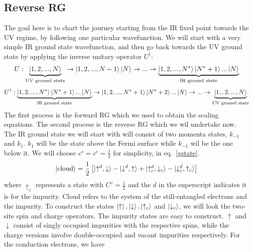 \documentclass[12pt,twoside]{article}
\numberwithin{equation}{section}
\begin{document}
\subsection{Reverse RG}
The goal here is to chart the journey starting from the IR fixed point towards the UV regime, by following one particular wavefunction. We will start with a very simple IR ground state wavefunction, and then go back towards the UV ground state by applying the inverse unitary operator \(U^\dagger\):
\begin{equation*}\begin{aligned}
	U : \underbrace{\ket{1,2,...,N}}_\text{UV ground state} \rightarrow \ket{1,2,...,N-1}\ket{N} \rightarrow ... \rightarrow \underbrace{\ket{1,2,...,N^*}\ket{N^*+1}...\ket{N}}_\text{IR ground state}
\end{aligned}\end{equation*}
\begin{equation*}\begin{aligned}
	U^\dagger : \underbrace{\ket{1,2,...,N^*}\ket{N^*+1}...\ket{N}}_\text{IR ground state} \rightarrow \ket{1,2,...,N^*+1}\ket{N^*+2}...\ket{N} \rightarrow ... \rightarrow\underbrace{\ket{1,,2,...,N}}_\text{UV ground state}
\end{aligned}\end{equation*}
The first process is the forward RG which we used to obtain the scaling equations. The second process is the reverse RG which we wil undertake now. The IR ground state we will start with will consist of two momenta states, \(k_{-1}\) and \(k_1\). \(k_1\) will be the state above the Fermi surface while \(k_{-1}\) wil be the one below it. We will choose \(c^s = c^c = \frac{1}{2}\) for simplicity, in eq.~\ref{gstate}.
\begin{equation}\begin{aligned}
	\ket{\text{cloud}} = \frac{1}{2}\left[ \ket{\uparrow^d, \downarrow} - \ket{\downarrow^d, \uparrow} + \ket{ \uparrow^d_c, \downarrow_c} - \ket{\downarrow^d_c, \uparrow_c} \right] 
\end{aligned}\end{equation}
where \(\uparrow_c\) represents a state with \(C^z= \frac{1}{2}\) and the \(d\) in the superscript indicates it is for the impurity. Cloud refers to the system of the still-entangled electrons and the impurity. To construct the states \(\ket{\uparrow}, \ket{\downarrow}, \ket{\uparrow_c}\) and \(\ket{\downarrow_c}\), we will look the two-site spin and charge operators. The impurity states are easy to construct. \(\uparrow\) and \(\downarrow\) consist of singly occupied impurities with the respective spins, while the charge versions involve double-occupied and vacant impurities respectively. For the conduction electrons, we have
\end{document}
